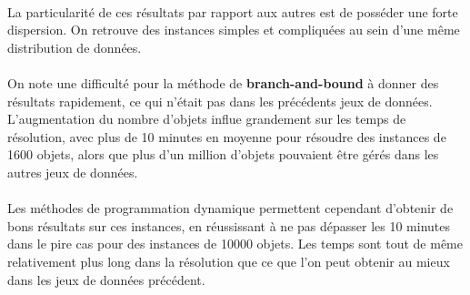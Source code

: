 \documentclass[12pt]{article}
\begin{document}
\paragraph{}La particularité de ces résultats par rapport aux autres est de posséder une forte dispersion. On retrouve des instances simples et compliquées au sein d'une même distribution de données.
\paragraph{}On note une difficulté pour la méthode de \textbf{branch-and-bound} à donner des résultats rapidement, ce qui n'était pas dans les précédents jeux de données. L'augmentation du nombre d'objets influe grandement sur les temps de résolution, avec plus de 10 minutes en moyenne pour résoudre des instances de 1600 objets, alors que plus d'un million d'objets pouvaient être gérés dans les autres jeux de données.
\paragraph{}Les méthodes de programmation dynamique permettent cependant d'obtenir de bons résultats sur ces instances, en réussissant à ne pas dépasser les 10 minutes dans le pire cas pour des instances de 10000 objets. Les temps sont tout de même relativement plus long dans la résolution que ce que l'on peut obtenir au mieux dans les jeux de données précédent.
\end{document}
